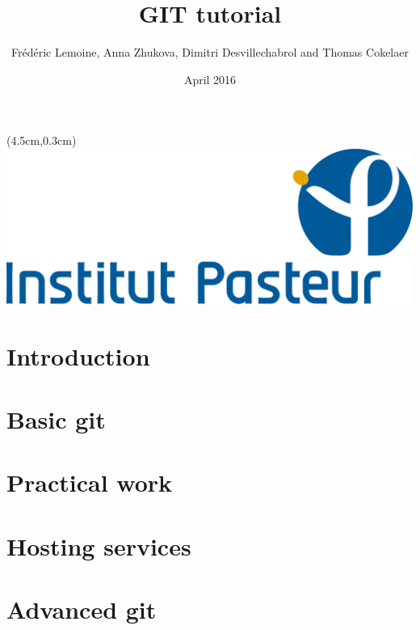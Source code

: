 \documentclass{beamer}
\title{GIT tutorial}
\author[F. Lemoine, A. Zhukova, D.Desvillechabrol \& T.Cokelaer]{Frédéric
Lemoine, Anna Zhukova, Dimitri Desvillechabrol and Thomas Cokelaer}
\institute{Institut Pasteur}
\date{April 2016}
\begin{document}

\begin{frame}[plain]
    \titlepage
    \begin{textblock*}{5cm}(4.5cm,0.3cm)
        \includegraphics[scale=0.09]{../images/Institut_Pasteur.png}
    \end{textblock*}
\end{frame}


\section{Introduction}


\section{Basic git}


\section{Practical work}



\section{Hosting services}



\section{Advanced git}

\end{document}
